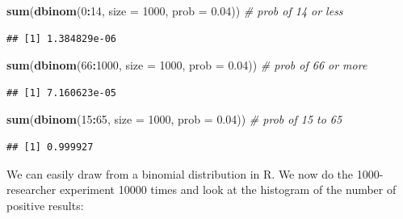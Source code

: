 \documentclass[
]{book}
\newenvironment{Shaded}{\begin{snugshade}}{\end{snugshade}}
\newcommand{\AttributeTok}[1]{\textcolor[rgb]{0.13,0.29,0.53}{#1}}
\newcommand{\CommentTok}[1]{\textcolor[rgb]{0.56,0.35,0.01}{\textit{#1}}}
\newcommand{\DecValTok}[1]{\textcolor[rgb]{0.00,0.00,0.81}{#1}}
\newcommand{\FloatTok}[1]{\textcolor[rgb]{0.00,0.00,0.81}{#1}}
\newcommand{\FunctionTok}[1]{\textcolor[rgb]{0.13,0.29,0.53}{\textbf{#1}}}
\newcommand{\NormalTok}[1]{#1}
\newcommand{\SpecialCharTok}[1]{\textcolor[rgb]{0.81,0.36,0.00}{\textbf{#1}}}
\begin{document}
\begin{Shaded}
\begin{Highlighting}[]
\FunctionTok{sum}\NormalTok{(}\FunctionTok{dbinom}\NormalTok{(}\DecValTok{0}\SpecialCharTok{:}\DecValTok{14}\NormalTok{, }\AttributeTok{size =} \DecValTok{1000}\NormalTok{, }\AttributeTok{prob =} \FloatTok{0.04}\NormalTok{)) }\CommentTok{\# prob of 14 or less}
\end{Highlighting}
\end{Shaded}

\begin{verbatim}
## [1] 1.384829e-06
\end{verbatim}

\begin{Shaded}
\begin{Highlighting}[]
\FunctionTok{sum}\NormalTok{(}\FunctionTok{dbinom}\NormalTok{(}\DecValTok{66}\SpecialCharTok{:}\DecValTok{1000}\NormalTok{, }\AttributeTok{size =} \DecValTok{1000}\NormalTok{, }\AttributeTok{prob =} \FloatTok{0.04}\NormalTok{)) }\CommentTok{\# prob of 66 or more}
\end{Highlighting}
\end{Shaded}

\begin{verbatim}
## [1] 7.160623e-05
\end{verbatim}

\begin{Shaded}
\begin{Highlighting}[]
\FunctionTok{sum}\NormalTok{(}\FunctionTok{dbinom}\NormalTok{(}\DecValTok{15}\SpecialCharTok{:}\DecValTok{65}\NormalTok{, }\AttributeTok{size =} \DecValTok{1000}\NormalTok{, }\AttributeTok{prob =} \FloatTok{0.04}\NormalTok{)) }\CommentTok{\# prob of 15 to 65}
\end{Highlighting}
\end{Shaded}

\begin{verbatim}
## [1] 0.999927
\end{verbatim}

We can easily draw from a binomial distribution in R.
We now do the 1000-researcher experiment 10000 times and look at
the histogram of the number of positive results:
\end{document}
